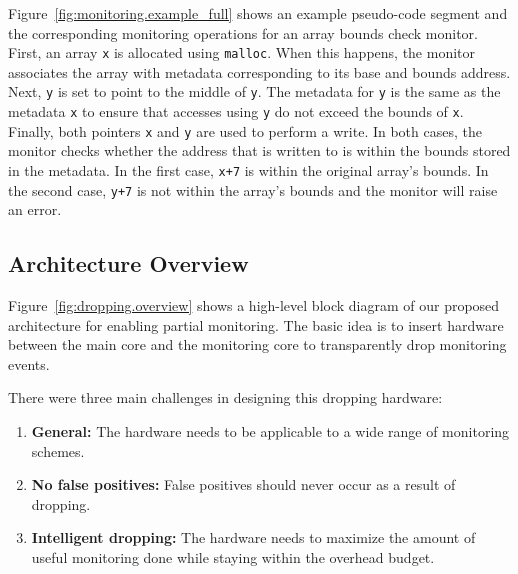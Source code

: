 Figure~\ref{fig:monitoring.example_full} shows an example pseudo-code segment and
the corresponding monitoring operations for an array bounds check monitor. 
First, an array {\tt x} is allocated using {\tt malloc}. When this happens, the
monitor associates the array with metadata corresponding to its base and bounds
address. Next, {\tt y} is set to point to the middle of {\tt y}. The metadata
for {\tt y} is the same as the metadata {\tt x} to ensure that accesses using
{\tt y} do not exceed the bounds of {\tt x}. Finally, both pointers {\tt x} and
{\tt y} are used to perform a write. In both cases, the monitor checks whether
the address that is written to is within the bounds stored in the metadata. In
the first case, {\tt x+7} is within the original array's bounds. In the second
case, {\tt y+7} is not within the array's bounds and the monitor will raise an
error.

\subsection{Architecture Overview}


Figure~\ref{fig:dropping.overview} shows a high-level block diagram of our
proposed architecture for enabling partial monitoring. The basic idea is to
insert hardware between the main core and the monitoring core to transparently
drop monitoring events. 

There were three main challenges in designing this dropping hardware:
\begin{enumerate}
  \item \textbf{General:} The hardware needs to be applicable to a wide range of monitoring schemes.
  \item \textbf{No false positives:} False positives should never occur as a result of dropping.
  \item \textbf{Intelligent dropping:} The hardware needs to maximize the amount of useful monitoring done while staying within the overhead budget.
\end{enumerate}

